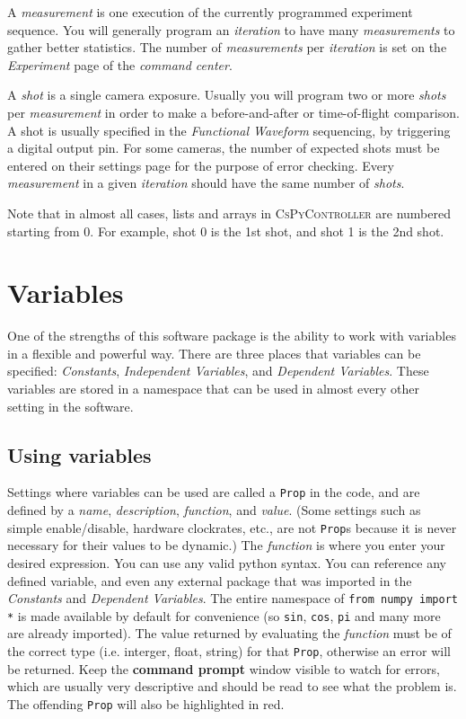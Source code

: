 \documentclass[pdftex,11pt,letterpaper]{article}
\begin{document}
A \textit{measurement} is one execution of the currently programmed experiment sequence.  You will generally program an \textit{iteration} to have many \textit{measurements} to gather better statistics.  The number of \textit{measurements} per \textit{iteration} is set on the \textit{Experiment} page of the \textit{command center}.

A \textit{shot} is a single camera exposure.  Usually you will program two or more \textit{shots} per \textit{measurement} in order to make a before-and-after or time-of-flight comparison.  A shot is usually specified in the \textit{Functional Waveform} sequencing, by triggering a digital output pin.  For some cameras, the number of expected shots must be entered on their settings page for the purpose of error checking.  Every \textit{measurement} in a given \textit{iteration} should have the same number of \textit{shots}.

Note that in almost all cases, lists and arrays in \textsc{CsPyController} are numbered starting from 0.  For example, shot 0 is the 1st shot, and shot 1 is the 2nd shot.

\section{Variables} \label{sec:Variables}

One of the strengths of this software package is the ability to work with variables in a flexible and powerful way.  There are three places that variables can be specified: \textit{Constants}, \textit{Independent Variables}, and \textit{Dependent Variables}.  These variables are stored in a namespace that can be used in almost every other setting in the software.


\subsection{Using variables}

Settings where variables can be used are called a \texttt{Prop} in the code, and are defined by a \textit{name}, \textit{description}, \textit{function}, and \textit{value}.  (Some settings such as simple enable/disable, hardware clockrates, etc., are not \texttt{Prop}s because it is never necessary for their values to be dynamic.)  The \textit{function} is where you enter your desired expression.  You can use any valid python syntax.  You can reference any defined variable, and even any external package that was imported in the \textit{Constants} and \textit{Dependent Variables}.  The entire namespace of \texttt{from numpy import *} is made available by default for convenience (so \texttt{sin}, \texttt{cos}, \texttt{pi} and many more are already imported).  The value returned by evaluating the \textit{function} must be of the correct type (i.e. interger, float, string) for that \texttt{Prop}, otherwise an error will be returned.  Keep the \textbf{command prompt} window visible to watch for errors, which are usually very descriptive and should be read to see what the problem is.  The offending \texttt{Prop} will also be highlighted in red.
\end{document}
